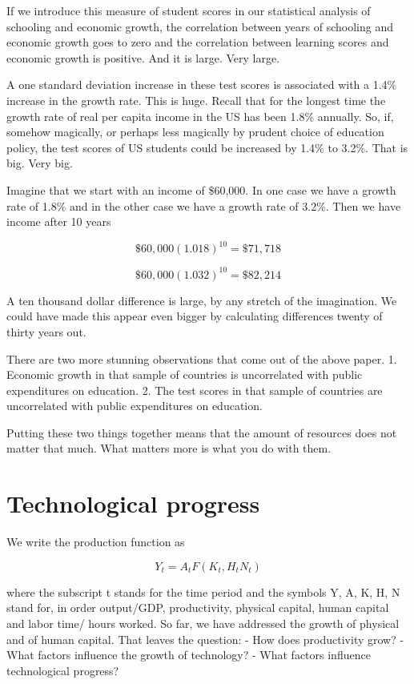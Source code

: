\documentclass[
]{book}
\begin{document}
If we introduce this measure of student scores in our statistical analysis of schooling and economic growth, the correlation between years of schooling and economic growth goes to zero and the correlation between learning scores and economic growth is positive. And it is large. Very large.

A one standard deviation increase in these test scores is associated with a 1.4\% increase in the growth rate. This is huge. Recall that for the longest time the growth rate of real per capita income in the US has been 1.8\% annually. So, if, somehow magically, or perhaps less magically by prudent choice of education policy, the test scores of US students could be increased by 1.4\% to 3.2\%. That is big. Very big.

Imagine that we start with an income of \$60,000. In one case we have a growth rate of 1.8\% and in the other case we have a growth rate of 3.2\%. Then we have income after 10 years

\[\$60,000 (1.018)^{10} = \$71,718 \]

\[\$60,000 (1.032)^{10} = \$82,214\]

A ten thousand dollar difference is large, by any stretch of the imagination. We could have made this appear even bigger by calculating differences twenty of thirty years out.

There are two more stunning observations that come out of the above paper.
1. Economic growth in that sample of countries is uncorrelated with public expenditures on education.
2. The test scores in that sample of countries are uncorrelated with public expenditures on education.

Putting these two things together means that the amount of resources does not matter that much. What matters more is what you do with them.

\hypertarget{technological-progress}{%
\section{Technological progress}\label{technological-progress}}

We write the production function as

\[Y_t  =  A_t F( K_t, H_tN_t)\]

where the subscript t stands for the time period and the symbols Y, A, K, H, N stand for, in order output/GDP, productivity, physical capital, human capital and labor time/ hours worked. So far, we have addressed the growth of physical and of human capital. That leaves the question:
- How does productivity grow?
- What factors influence the growth of technology?
- What factors influence technological progress?
\end{document}
